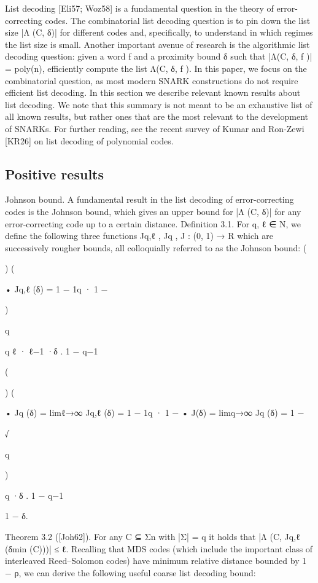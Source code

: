 \documentclass[11pt]{article}
\begin{document}
List decoding [Eli57; Woz58] is a fundamental question in the theory of error-correcting codes. The
combinatorial list decoding question is to pin down the list size |Λ (C, δ)| for different codes and,
specifically, to understand in which regimes the list size is small. Another important avenue of
research is the algorithmic list decoding question: given a word f and a proximity bound δ such
that |Λ(C, δ, f )| = poly(n), efficiently compute the list Λ(C, δ, f ). In this paper, we focus on the
combinatorial question, as most modern SNARK constructions do not require efficient list decoding.
In this section we describe relevant known results about list decoding. We note that this
summary is not meant to be an exhaustive list of all known results, but rather ones that are the
most relevant to the development of SNARKs. For further reading, see the recent survey of Kumar
and Ron-Zewi [KR26] on list decoding of polynomial codes.


\subsection{Positive results}



Johnson bound. A fundamental result in the list decoding of error-correcting codes is the
Johnson bound, which gives an upper bound for |Λ (C, δ)| for any error-correcting code up to a
certain distance.
Definition 3.1. For q, ℓ ∈ N, we define the following three functions Jq,ℓ , Jq , J : (0, 1) → R which
are successively rougher bounds, all colloquially referred to as the Johnson bound:
(

) (

• Jq,ℓ (δ) = 1 − 1q · 1 −

)

q

q
ℓ
· ℓ−1
·δ .
1 − q−1

(

) (

• Jq (δ) = limℓ→∞ Jq,ℓ (δ) = 1 − 1q · 1 −
• J(δ) = limq→∞ Jq (δ) = 1 −

√

q

)

q
·δ .
1 − q−1

1 − δ.

Theorem 3.2 ([Joh62]). For any C ⊆ Σn with |Σ| = q it holds that |Λ (C, Jq,ℓ (δmin (C)))| ≤ ℓ.
Recalling that MDS codes (which include the important class of interleaved Reed–Solomon
codes) have minimum relative distance bounded by 1 − ρ, we can derive the following useful coarse
list decoding bound:
\end{document}
